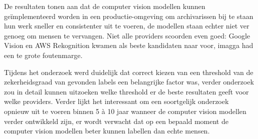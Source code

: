 De resultaten tonen aan dat de computer vision modellen kunnen geïmplementeerd worden in een productie-omgeving om archivarissen bij te staan hun werk sneller en consistenter uit te voeren, de modellen staan echter niet ver genoeg om mensen te vervangen. Niet alle providers scoorden even goed: Google Vision en AWS Rekognition kwamen als beste kandidaten naar voor, imagga had een te grote foutenmarge. 

Tijdens het onderzoek werd duidelijk dat correct kiezen van een threshold van de zekerheidsgraad van gevonden labels een belangrijke factor was, verder onderzoek zou in detail kunnen uitzoeken welke threshold er de beste resultaten geeft voor welke providers. Verder lijkt het interessant om een soortgelijk onderzoek opnieuw uit te voeren binnen 5 à 10 jaar wanneer de computer vision modellen verder ontwikkeld zijn, er wordt verwacht dat op een bepaald moment de computer vision modellen beter kunnen labellen dan echte mensen.

